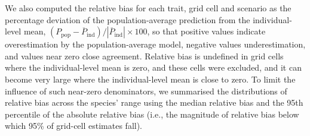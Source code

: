 \documentclass[12pt]{article}
\begin{document}
We also computed the relative bias for each trait, grid cell and scenario as the percentage deviation of the population-average prediction from the individual-level mean, $(P_{\mathrm{pop}} - \overline{P}_{\mathrm{ind}}) / |\overline{P}_{\mathrm{ind}}| \times 100$, so that positive values indicate overestimation by the population-average model, negative values underestimation, and values near zero close agreement. Relative bias is undefined in grid cells where the individual-level mean is zero, and these cells were excluded, and it can become very large where the individual-level mean is close to zero. To limit the influence of such near-zero denominators, we summarised the distributions of relative bias across the species' range using the median relative bias and the 95th percentile of the absolute relative bias (i.e., the magnitude of relative bias below which 95\% of grid-cell estimates fall).

\printbibliography[heading=bibnumbered, title={References}]
\end{document}
